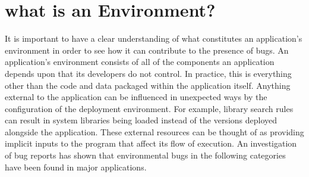 \section{what is an Environment?}
\label{SEC:background}

It is important
to have a clear understanding
of what constitutes an application's environment
in order to see how it can contribute to the presence of bugs.
An application's environment consists of
all of the components an application depends upon
that its developers do not control.
In practice, this is everything other than the code and data packaged
within the application itself.
Anything external to the application can be
influenced in unexpected ways by the configuration of the
deployment environment.
For example, library search rules can result in system libraries
being loaded instead of
the versions deployed alongside the application.
These external resources can be thought of as
providing implicit inputs to the program that affect its flow of execution.
An investigation of bug reports has shown that environmental bugs in the
following categories have been found in major applications.

